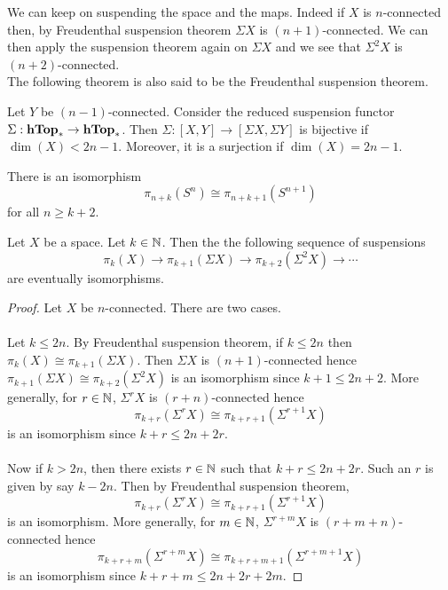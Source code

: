 \documentclass[a4paper]{article}
\begin{document}
We can keep on suspending the space and the maps. Indeed if $X$ is $n$-connected then, by Freudenthal suspension theorem $\Sigma X$ is $(n+1)$-connected. We can then apply the suspension theorem again on $\Sigma X$ and we see that $\Sigma^2X$ is $(n+2)$-connected. \\

The following theorem is also said to be the Freudenthal suspension theorem. 

\begin{thm}{}{} Let $Y$ be $(n-1)$-connected. Consider the reduced suspension functor $\Sigma:\bold{hTop}_\ast\to\bold{hTop}_\ast$. Then $\Sigma:[X,Y]\to[\Sigma X,\Sigma Y]$ is bijective if $\dim(X)<2n-1$. Moreover, it is a surjection if $\dim(X)=2n-1$. 
\end{thm}

\begin{crl}{}{} There is an isomorphism $$\pi_{n+k}(S^n)\cong\pi_{n+k+1}(S^{n+1})$$ for all $n\geq k+2$. 
\end{crl}

\begin{prp}{}{} Let $X$ be a space. Let $k\in\mathbb{N}$. Then the the following sequence of suspensions $$\pi_k(X)\to\pi_{k+1}(\Sigma X)\to\pi_{k+2}(\Sigma^2X)\to\cdots$$ are eventually isomorphisms. \tcbline
\begin{proof}
Let $X$ be $n$-connected. There are two cases. \\~\\

Let $k\leq 2n$. By Freudenthal suspension theorem, if $k\leq 2n$ then $\pi_k(X)\cong\pi_{k+1}(\Sigma X)$. Then $\Sigma X$ is $(n+1)$-connected hence $\pi_{k+1}(\Sigma X)\cong\pi_{k+2}(\Sigma^2X)$ is an isomorphism since $k+1\leq 2n+2$. More generally, for $r\in\mathbb{N}$, $\Sigma^rX$ is $(r+n)$-connected hence $$\pi_{k+r}(\Sigma^rX)\cong\pi_{k+r+1}(\Sigma^{r+1}X)$$ is an isomorphism since $k+r\leq 2n+2r$. \\~\\

Now if $k>2n$, then there exists $r\in\mathbb{N}$ such that $k+r\leq 2n+2r$. Such an $r$ is given by say $k-2n$. Then by Freudenthal suspension theorem, $$\pi_{k+r}(\Sigma^rX)\cong\pi_{k+r+1}(\Sigma^{r+1}X)$$ is an isomorphism. More generally, for $m\in\mathbb{N}$, $\Sigma^{r+m}X$ is $(r+m+n)$-connected hence $$\pi_{k+r+m}(\Sigma^{r+m}X)\cong\pi_{k+r+m+1}(\Sigma^{r+m+1}X)$$ is an isomorphism since $k+r+m\leq 2n+2r+2m$. 
\end{proof}
\end{prp}
\end{document}
